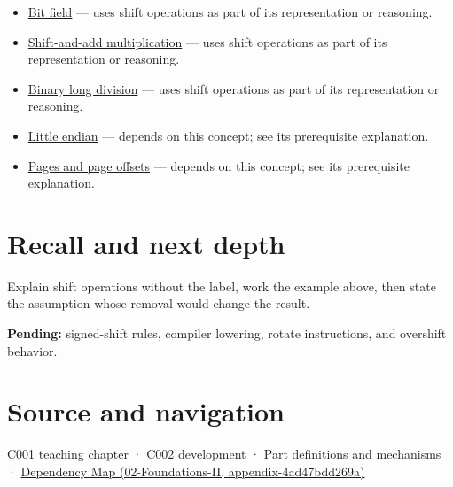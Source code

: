 \begin{itemize}
\item
  \hyperref[appendix-ac697f5c66e8]{Bit field} --- uses shift operations as part of its representation or reasoning.
\item
  \hyperref[appendix-a65290d66ed9]{Shift-and-add multiplication} --- uses shift operations as part of its representation or reasoning.
\item
  \hyperref[appendix-89985e6a2685]{Binary long division} --- uses shift operations as part of its representation or reasoning.
\item
  \hyperref[appendix-367b6abf460e]{Little endian} --- depends on this concept; see its prerequisite explanation.
\item
  \hyperref[appendix-0c67cd5bf30a]{Pages and page offsets} --- depends on this concept; see its prerequisite explanation.
\end{itemize}

\section{Recall and next depth}\label{appendix-73425b25118e-recall-and-next-depth}

Explain shift operations without the label, work the example above, then state the assumption whose removal would change the result.

\textbf{Pending:} signed-shift rules, compiler lowering, rotate instructions, and overshift behavior.

\section{Source and navigation}\label{appendix-73425b25118e-source-and-navigation}

\href{Continuous\%20Notes/Computing\%20Foundations\%20-\%20From\%20Bits\%20to\%20C++\%20and\%20Systems\%20APIs\#From\%20a\%20signal\%20to\%20an\%20interpretation}{C001 teaching chapter} · \href{Continuous\%20Notes/Computing\%20Foundations\%20-\%20From\%20Bits\%20to\%20C++\%20and\%20Systems\%20APIs\#Arithmetic\%20becomes\%20a\%20policy}{C002 development} · \hyperref[appendix-fd090d982a15]{Part definitions and mechanisms} · \href{../02-Foundations-II/main.pdf\#nameddest=appendix-4ad47bdd269a}{Dependency Map (02-Foundations-II, appendix-4ad47bdd269a)}
